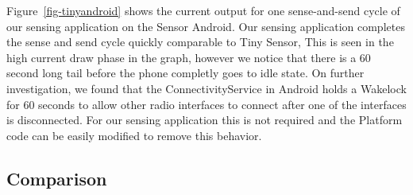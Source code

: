 Figure~\ref{fig-tinyandroid} shows the current output for one sense-and-send cycle of our sensing application on the Sensor Android. Our sensing application 
completes the sense and send cycle quickly comparable to Tiny Sensor, This is seen in the high current draw phase in the graph, however we notice that there is a 60 second long tail before
the phone completly goes to idle state. On further investigation, we found that the ConnectivityService in Android holds a Wakelock for 60 seconds to allow other radio interfaces to connect
after one of the interfaces is disconnected. For our sensing application this is not required and the Platform code can be easily modified to remove this behavior.



\subsection{Comparison}
